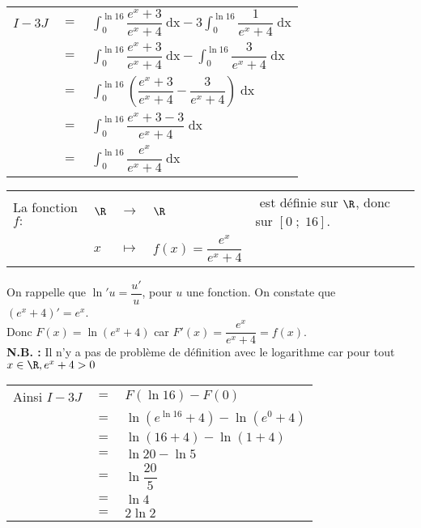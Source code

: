 \begin{tabular}{lll}
$I - 3J$ & $=$ & $\displaystyle \int_0^{\ln 16} \dfrac{e^x + 3}{e^x + 4} \; \mathrm{dx} - 3\displaystyle \int_0^{\ln 16} \dfrac{1}{e^x + 4} \; \mathrm{dx}$ \vspace*{.3cm} \\
& $=$ & $\displaystyle \int_0^{\ln 16} \dfrac{e^x + 3}{e^x + 4} \; \mathrm{dx} - \displaystyle \int_0^{\ln 16} \dfrac{3}{e^x + 4} \; \mathrm{dx}$ \vspace*{.3cm} \\
& $=$ & $\displaystyle \int_0^{\ln 16} \left(\dfrac{e^x + 3}{e^x + 4} - \dfrac{3}{e^x + 4}\right) \; \mathrm{dx}$ \vspace*{.3cm} \\
& $=$ & $\displaystyle \int_0^{\ln 16} \dfrac{e^x + 3 - 3}{e^x + 4} \; \mathrm{dx}$ \vspace*{.3cm} \\
& $=$ & $\displaystyle \int_0^{\ln 16} \dfrac{e^x}{e^x + 4} \; \mathrm{dx}$ \vspace*{.3cm} \\
\end{tabular}

\vspace*{.3cm}

\begin{tabular}{lllll}
La fonction $f:$ & $\R$ & $\longrightarrow$ & $\R$ & $\! \! \! \! \! \! \! \! \! \! \! \! \! \! \! \! \! \! \! \! \! \! \! \! \! \! \! \! \! \! \! \! \! \! \! \! \! \! \! \! \! \! \! \! \! \! \! \! \! \! $ est définie sur $\R$, donc sur $\left[0 \; ; \; 16\right]$. \\
& $x$ & $\longmapsto$ & $f(x) = \dfrac{e^x}{e^x + 4}$ & \\
\end{tabular}

\vspace*{.3cm}

On rappelle que $\ln'u = \dfrac{u'}{u}$, pour $u$ une fonction. On constate que $\left(e^x + 4\right)' = e^x$. \\

Donc $F(x) = \ln\left(e^x + 4\right)$ car $F'\left(x\right) = \dfrac{e^x}{e^x + 4} = f\left(x\right)$. \\

\textbf{N.B. :} Il n'y a pas de problème de définition avec le logarithme car pour tout $x \in \R, e^x + 4 > 0$ 

\newpage

\begin{tabular}{lll}
Ainsi $I - 3J$ & $ = $ & $ F\left(\ln 16\right) - F\left(0\right)$ \\
& $=$ & $\ln\left(e^{\ln 16} + 4\right) - \ln\left(e^0 + 4\right)$ \\
& $=$ & $\ln\left(16 + 4\right) - \ln \left(1+4\right)$ \\
& $=$ & $\ln 20 - \ln 5$ \\
& $=$ & $\ln \dfrac{20}{5}$ \vspace*{.2cm} \\
& $=$ & $\ln 4$ \\
& $=$ & $2\ln 2$ \\
\end{tabular}

